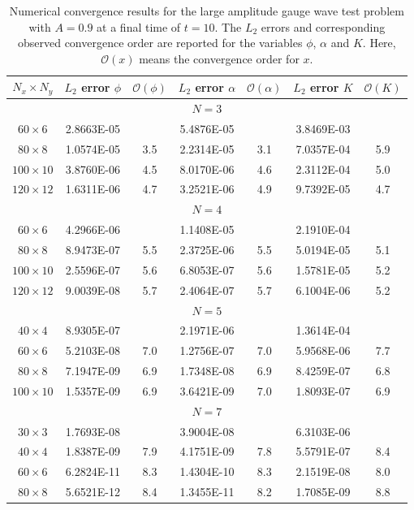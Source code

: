 \begin{table}[t]
	\caption[
	Gauge Wave convergence table 
	]{Numerical convergence results for the large amplitude gauge wave
		test problem with $A=0.9$ at a final time of $t=10$.  The $L_2$
		errors and corresponding observed convergence order are reported for
		the variables $\phi$, $\alpha$ and $K$.
		Here, $\mathcal O({x})$ means the convergence order for $x$.
	}
	\centering\begin{adjustbox}{center,scale=0.9}
		\begin{tabular}{ccccccc}
			\hline
			$N_x \times N_y$ & ${L_2}$ error $\phi$ & $\mathcal{O}(\phi)$  & ${L_2}$ error $\alpha$ & $\mathcal{O}(\alpha)$  & ${L_2}$ error $K$ & $\mathcal{O}(K)$  \\
			\hline
			\multicolumn{7}{c}{$N=3$}   \\
			\hline
			$60 \times  6$  & 2.8663E-05 &     & 5.4876E-05 &      & 3.8469E-03 &      \\
			$80 \times  8$  & 1.0574E-05 & 3.5 & 2.2314E-05 & 3.1  & 7.0357E-04 & 5.9  \\
			$100\times 10$  & 3.8760E-06 & 4.5 & 8.0170E-06 & 4.6  & 2.3112E-04 & 5.0  \\
			$120\times 12$  & 1.6311E-06 & 4.7 & 3.2521E-06 & 4.9  & 9.7392E-05 & 4.7  \\
			\hline
			\multicolumn{7}{c}{$N=4$}   \\
			\hline
			$60 \times  6$  & 4.2966E-06 &     & 1.1408E-05 &      & 2.1910E-04 &      \\
			$80 \times  8$  & 8.9473E-07 & 5.5 & 2.3725E-06 & 5.5  & 5.0194E-05 & 5.1  \\
			$100\times 10$  & 2.5596E-07 & 5.6 & 6.8053E-07 & 5.6  & 1.5781E-05 & 5.2  \\
			$120\times 12$  & 9.0039E-08 & 5.7 & 2.4064E-07 & 5.7  & 6.1004E-06 & 5.2  \\
			\hline
			\multicolumn{7}{c}{$N=5$}   \\
			\hline
			$40 \times  4$  & 8.9305E-07 &     & 2.1971E-06 &      & 1.3614E-04 &      \\
			$60 \times  6$  & 5.2103E-08 & 7.0 & 1.2756E-07 & 7.0  & 5.9568E-06 & 7.7  \\
			$80 \times  8$  & 7.1947E-09 & 6.9 & 1.7348E-08 & 6.9  & 8.4259E-07 & 6.8  \\
			$100\times 10$  & 1.5357E-09 & 6.9 & 3.6421E-09 & 7.0  & 1.8093E-07 & 6.9  \\
			\hline
			\multicolumn{7}{c}{$N=7$}   \\
			\hline
			$30 \times 3$  & 1.7693E-08 &      & 3.9004E-08 &       & 6.3103E-06 &       \\
			$40 \times 4$  & 1.8387E-09 & 7.9  & 4.1751E-09 &  7.8  & 5.5791E-07 &  8.4  \\
			$60 \times 6$  & 6.2824E-11 & 8.3  & 1.4304E-10 &  8.3  & 2.1519E-08 &  8.0  \\
			$80 \times 8$  & 5.6521E-12 & 8.4  & 1.3455E-11 &  8.2  & 1.7085E-09 &  8.8  \\
			\hline
		\end{tabular}
	\end{adjustbox}
	\label{tab.conv1}
\end{table}

